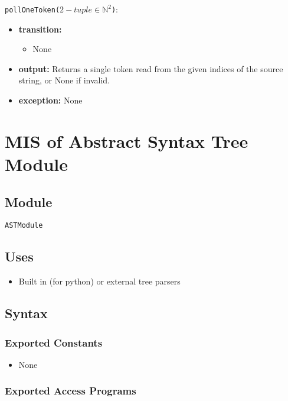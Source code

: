 \documentclass[12pt, titlepage]{article}
\begin{document}
\begin{itemize}
\noindent \texttt{pollOneToken($2-tuple \in \mathbb{N}^2$)}:
\begin{itemize}
    \item \textbf{transition:}
    \begin{itemize}
        \item None
    \end{itemize}
    \item \textbf{output:} Returns a single token read from the given indices of the source string, or None if invalid.
    \item \textbf{exception:} None
\end{itemize}

\section{MIS of Abstract Syntax Tree Module} \label{smAST}

\subsection{Module}

\texttt{ASTModule}

\subsection{Uses}

\begin{itemize}
    \item Built in (for python) or external tree parsers
\end{itemize}

\subsection{Syntax}

\subsubsection{Exported Constants}

\begin{itemize}
    \item None
\end{itemize}

\subsubsection{Exported Access Programs}


\end{itemize}
\end{document}
